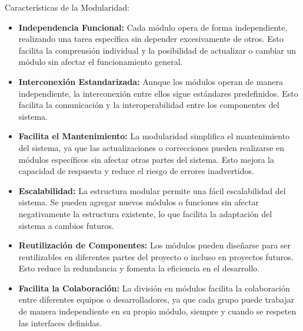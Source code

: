 Características de la Modularidad:

\begin{itemize}
\item \textbf{Independencia Funcional:}
Cada módulo opera de forma independiente, realizando una tarea específica sin depender excesivamente de otros. Esto facilita la comprensión individual y la posibilidad de actualizar o cambiar un módulo sin afectar el funcionamiento general.

\item \textbf{Interconexión Estandarizada:}
Aunque los módulos operan de manera independiente, la interconexión entre ellos sigue estándares predefinidos. Esto facilita la comunicación y la interoperabilidad entre los componentes del sistema.

\item \textbf{Facilita el Mantenimiento:}
La modularidad simplifica el mantenimiento del sistema, ya que las actualizaciones o correcciones pueden realizarse en módulos específicos sin afectar otras partes del sistema. Esto mejora la capacidad de respuesta y reduce el riesgo de errores inadvertidos.

\item \textbf{Escalabilidad:}
La estructura modular permite una fácil escalabilidad del sistema. Se pueden agregar nuevos módulos o funciones sin afectar negativamente la estructura existente, lo que facilita la adaptación del sistema a cambios futuros.

\item \textbf{Reutilización de Componentes:}
Los módulos pueden diseñarse para ser reutilizables en diferentes partes del proyecto o incluso en proyectos futuros. Esto reduce la redundancia y fomenta la eficiencia en el desarrollo.

\item \textbf{Facilita la Colaboración:}
La división en módulos facilita la colaboración entre diferentes equipos o desarrolladores, ya que cada grupo puede trabajar de manera independiente en su propio módulo, siempre y cuando se respeten las interfaces definidas.
\end{itemize}

